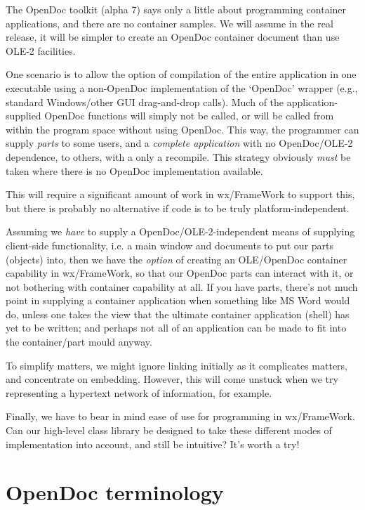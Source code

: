 The OpenDoc toolkit (alpha 7) says only a little about programming
container applications, and there are no container samples. We will
assume in the real release, it will be simpler to create an OpenDoc
container document than use OLE-2 facilities.

One scenario is to allow the option of compilation of the entire
application in one executable using a non-OpenDoc implementation of the
`OpenDoc' wrapper (e.g., standard Windows/other GUI drag-and-drop
calls). Much of the application-supplied OpenDoc functions will simply
not be called, or will be called from within the program space without using
OpenDoc. This way, the programmer can supply {\it parts} to some users,
and a {\it complete application} with no OpenDoc/OLE-2 dependence, to
others, with a only a recompile. This strategy obviously {\it must} be taken where
there is no OpenDoc implementation available.

This will require a significant amount of work in wx/FrameWork to
support this, but there is probably no alternative if code is to be
truly platform-independent.

Assuming we {\it have} to supply a OpenDoc/OLE-2-independent means of
supplying client-side functionality, i.e. a main window and documents to
put our parts (objects) into, then we have the {\it option} of creating
an OLE/OpenDoc container capability in wx/FrameWork, so that our OpenDoc parts can
interact with it, or not bothering with container capability at all.
If you have parts, there's not much point in supplying a
container application when something like MS Word would do, unless one
takes the view that the ultimate container application (shell) has yet
to be written; and perhaps not all of an application can be made to fit
into the container/part mould anyway.

To simplify matters, we might ignore linking initially as it complicates
matters, and concentrate on embedding. However, this will come unstuck
when we try representing a hypertext network of information, for example.

Finally, we have to bear in mind ease of use for programming in wx/FrameWork.
Can our high-level class library be designed to take these different modes of
implementation into account, and still be intuitive? It's worth a try!

\section{OpenDoc terminology}

